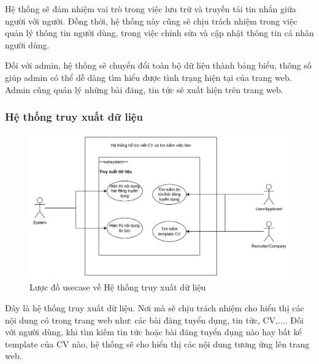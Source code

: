 Hệ thống sẽ đảm nhiệm vai trò trong việc lưu trữ và truyền tải tin nhắn giữa người với người. Đồng thời, hệ thống này cũng sẽ chịu trách nhiệm trong việc quản lý thông tin người dùng, trong việc chỉnh sửa và cập nhật thông tin cá nhân người dùng.

Đối với admin, hệ thống sẽ chuyển đổi toàn bộ dữ liệu thành bảng biểu, thông số giúp admin có thể dễ dàng tìm hiểu được tình trạng hiện tại của trang web. Admin cũng quản lý những bài đăng, tin tức sẽ xuất hiện trên trang web.


\subsubsection{Hệ thống truy xuất dữ liệu}

\begin{figure}[H]
	\centering
    \includegraphics[scale=0.1]{img/TruyXuatDuLieu_Usecase.png}
    \caption{Lược đồ usecase về Hệ thống truy xuất dữ liệu}
\end{figure}

Đây là hệ thống truy xuất dữ liệu. Nơi mà sẽ chịu trách nhiệm cho hiển thị các nội dung có trong trang web như: các bài đăng tuyển dụng, tin tức, CV,.... Đối với người dùng, khi tìm kiếm tin tức hoặc bài đăng tuyển dụng nào hay bất kể template của CV nào, hệ thống sẽ cho hiển thị các nội dung tương ứng lên trang web.

